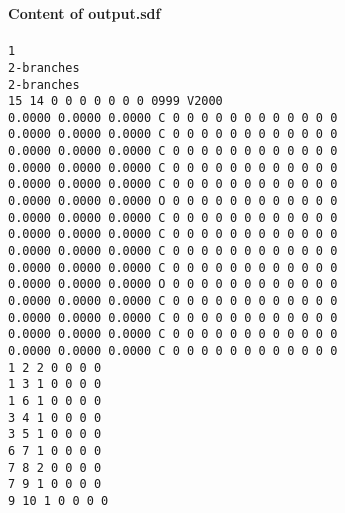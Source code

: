 \documentclass[11pt,titlepage,dvipdfmx,twoside]{article}
\begin{document}
\begin{oframed}
{\bf Content of output.sdf}\\\\
{\tt 1\\
2-branches\\
2-branches\\
 15 14  0  0  0  0  0  0  0  0999 V2000 \\
    0.0000    0.0000    0.0000  C  0  0  0  0  0  0  0  0  0  0  0  0\\
    0.0000    0.0000    0.0000  C  0  0  0  0  0  0  0  0  0  0  0  0\\
    0.0000    0.0000    0.0000  C  0  0  0  0  0  0  0  0  0  0  0  0\\
    0.0000    0.0000    0.0000  C  0  0  0  0  0  0  0  0  0  0  0  0\\
    0.0000    0.0000    0.0000  C  0  0  0  0  0  0  0  0  0  0  0  0\\
    0.0000    0.0000    0.0000  O  0  0  0  0  0  0  0  0  0  0  0  0\\
    0.0000    0.0000    0.0000  C  0  0  0  0  0  0  0  0  0  0  0  0\\
    0.0000    0.0000    0.0000  C  0  0  0  0  0  0  0  0  0  0  0  0\\
    0.0000    0.0000    0.0000  C  0  0  0  0  0  0  0  0  0  0  0  0\\
    0.0000    0.0000    0.0000  C  0  0  0  0  0  0  0  0  0  0  0  0\\
    0.0000    0.0000    0.0000  O  0  0  0  0  0  0  0  0  0  0  0  0\\
    0.0000    0.0000    0.0000  C  0  0  0  0  0  0  0  0  0  0  0  0\\
    0.0000    0.0000    0.0000  C  0  0  0  0  0  0  0  0  0  0  0  0\\
    0.0000    0.0000    0.0000  C  0  0  0  0  0  0  0  0  0  0  0  0\\
    0.0000    0.0000    0.0000  C  0  0  0  0  0  0  0  0  0  0  0  0\\
  1  2  2  0  0  0  0\\
  1  3  1  0  0  0  0\\
  1  6  1  0  0  0  0\\
  3  4  1  0  0  0  0\\
  3  5  1  0  0  0  0\\
  6  7  1  0  0  0  0\\
  7  8  2  0  0  0  0\\
  7  9  1  0  0  0  0\\
  9 10  1  0  0  0  0\\
}
\end{oframed}
\end{document}
